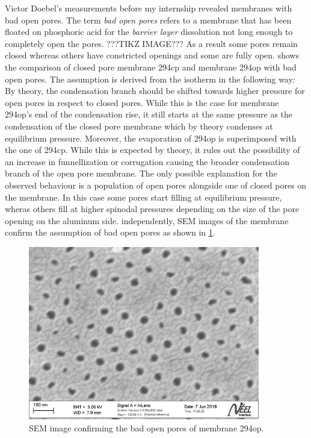 \documentclass[../thesis.tex]{subfiles}
\begin{document}
        

        Victor Doebel's measurements before my internship revealed membranes with bad open pores. The term \textit{bad open pores} refers to a membrane that has been floated on phosphoric acid for the \textit{barrier layer} dissolution not long enough to completely open the pores. ???TIKZ IMAGE??? As a result some pores remain closed whereas others have constricted openings and some are fully open.  shows the comparison of closed pore membrane 294cp and membrane 294op with bad open pores. The assumption is derived from the isotherm in the following way: By theory, the condensation branch should be shifted towards higher pressure for open pores in respect to closed pores. While this is the case for membrane 294op's end of the condensation rise, it still starts at the same pressure as the condensation of the closed pore membrane which by theory condenses at equilibrium pressure. Moreover, the evaporation of 294op is superimposed with the one of 294cp. While this is expected by theory, it rules out the possibility of an increase in funnellization or corrugation causing the broader condensation branch of the open pore membrane. The only possible explanation for the observed behaviour is a population of open pores alongside one of closed pores on the membrane. In this case some pores start filling at equilibrium pressure, wheras others fill at higher spinodal pressures depending on the size of the pore opening on the aluminum side. independently, SEM images of the membrane confirm the assumption of bad open pores as shown in \cref{fig:294-sem}.

        \begin{figure}[tbp]
          \includegraphics[width=0.9\textwidth]{images/294_bad_open_pores.jpg}
          \caption{SEM image confirming the bad open pores of membrane 294op.}
          \label{fig:294-sem}
        \end{figure}
\end{document}
